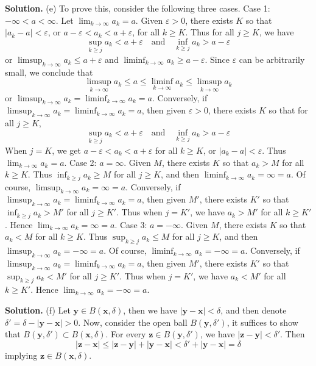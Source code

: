 \documentclass[12pt]{article}
\theoremstyle{definition}
\begin{document}
\smallskip
\noindent\textbf{Solution.}\quad
(e) To prove this, consider the following three cases.
Case 1: $-\infty<a<\infty$. Let $\lim_{k\to\infty}a_k=a$. Given $\varepsilon>0$, there exists $K$ so that $\left\vert a_k-a\right\vert<\varepsilon$, or $a-\varepsilon<a_k<a+\varepsilon$, for all $k\ge K$. Thus for all $j\ge K$, we have
$$
\sup_{k\ge j}a_k<a+\varepsilon\quad\mbox{and}\quad
\inf_{k\ge j}a_k>a-\varepsilon
$$ 
or $\limsup_{k\to\infty} a_k\le a+\varepsilon$ and $\liminf_{k\to\infty} a_k\ge a-\varepsilon$. Since $\varepsilon$ can be arbitrarily small, we conclude that
$$
\limsup_{k\to\infty} a_k\le a\le \liminf_{k\to\infty} a_k\le \limsup_{k\to\infty} a_k
$$
or $\limsup_{k\to\infty} a_k=\liminf_{k\to\infty} a_k=a$. Conversely, if $\limsup_{k\to\infty} a_k=\liminf_{k\to\infty} a_k=a$, then given $\varepsilon>0$, there exists $K$ so that for all $j\ge K$,
$$
\sup_{k\ge j}a_k<a+\varepsilon\quad\mbox{and}\quad
\inf_{k\ge j}a_k>a-\varepsilon
$$
When $j=K$, we get $a-\varepsilon<a_k<a+\varepsilon$ for all $k\ge K$, or $\left\vert a_k-a\right\vert<\varepsilon$. Thus $\lim_{k\to\infty}a_k=a$.
Case 2: $a=\infty$. Given $M$, there exists $K$ so that $a_k>M$ for all $k\ge K$. Thus $\inf_{k\ge j}a_k\ge M$ for all $j\ge K$, and then $\liminf_{k\to\infty}a_k=\infty=a$. Of course, $\limsup_{k\to\infty}a_k=\infty=a$. Conversely, if $\limsup_{k\to\infty} a_k=\liminf_{k\to\infty} a_k=a$, then given $M'$, there exists $K'$ so that $\inf_{k\ge j}a_k>M'$ for all $j\ge K'$. Thus when $j=K'$, we have $a_k>M'$ for all $k\ge K'$. Hence $\lim_{k\to\infty}a_k=\infty=a$.
Case 3: $a=-\infty$. Given $M$, there exists $K$ so that $a_k<M$ for all $k\ge K$. Thus $\sup_{k\ge j}a_k\le M$ for all $j\ge K$, and then $\limsup_{k\to\infty}a_k=-\infty=a$. Of course, $\liminf_{k\to\infty}a_k=-\infty=a$. Conversely, if $\limsup_{k\to\infty} a_k=\liminf_{k\to\infty} a_k=a$, then given $M'$, there exists $K'$ so that $\sup_{k\ge j}a_k<M'$ for all $j\ge K'$. Thus when $j=K'$, we have $a_k<M'$ for all $k\ge K'$. Hence $\lim_{k\to\infty}a_k=-\infty=a$.

\smallskip
\noindent\textbf{Solution.}\quad
(f) Let $\mathbf{y}\in B(\mathbf{x},\delta)$, then we have $\left\vert\mathbf{y}-\mathbf{x}\right\vert<\delta$, and then denote $\delta'=\delta-\left\vert\mathbf{y}-\mathbf{x}\right\vert>0$. Now, consider the open ball $B(\mathbf{y},\delta')$, it suffices to show that $B(\mathbf{y},\delta')\subset B(\mathbf{x},\delta)$. For every $\mathbf{z}\in B(\mathbf{y},\delta')$, we have $\left\vert\mathbf{z}-\mathbf{y}\right\vert<\delta'$. Then
$$
\left\vert\mathbf{z}-\mathbf{x}\right\vert
\le \left\vert\mathbf{z}-\mathbf{y}\right\vert+\left\vert\mathbf{y}-\mathbf{x}\right\vert
<\delta'+\left\vert\mathbf{y}-\mathbf{x}\right\vert
=\delta
$$
implying $\mathbf{z}\in B(\mathbf{x},\delta)$.
\end{document}
